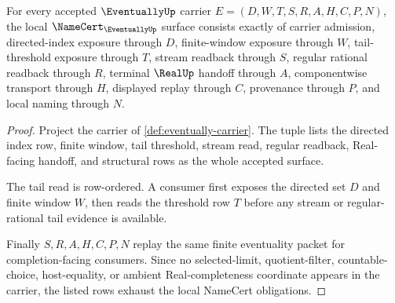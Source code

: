 \begin{theorem}
\label{thm:eventually-namecert-obligations}
For every accepted $\EventuallyUp$ carrier $E=(D,W,T,S,R,A,H,C,P,N)$, the local $\NameCert_{\EventuallyUp}$ surface consists exactly of carrier admission, directed-index exposure through $D$, finite-window exposure through $W$, tail-threshold exposure through $T$, stream readback through $S$, regular rational readback through $R$, terminal $\RealUp$ handoff through $A$, componentwise transport through $H$, displayed replay through $C$, provenance through $P$, and local naming through $N$.
\end{theorem}
\begin{proof}
Project the carrier of \autoref{def:eventually-carrier}. The tuple lists the directed index row, finite window, tail threshold, stream read, regular readback, Real-facing handoff, and structural rows as the whole accepted surface.

The tail read is row-ordered. A consumer first exposes the directed set $D$ and finite window $W$, then reads the threshold row $T$ before any stream or regular-rational tail evidence is available.

Finally $S,R,A,H,C,P,N$ replay the same finite eventuality packet for completion-facing consumers. Since no selected-limit, quotient-filter, countable-choice, host-equality, or ambient Real-completeness coordinate appears in the carrier, the listed rows exhaust the local NameCert obligations.
\end{proof}

